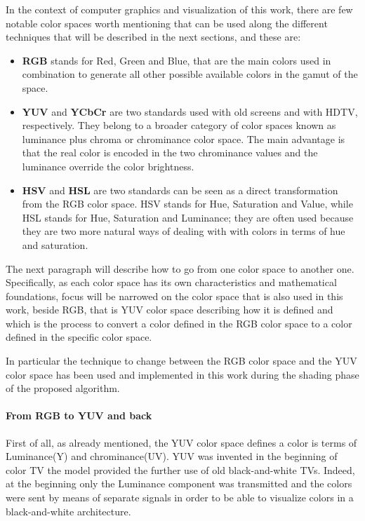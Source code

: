 \documentclass[12pt,a4paper]{extarticle}
\begin{document}
In the context of computer graphics and visualization of this work, there are few notable color spaces worth mentioning that can be used along the different techniques that will be described in the next sections, and these are:
\begin{itemize}
\item \textbf{RGB} stands for Red, Green and Blue, that are the main colors used in combination to generate all other possible available colors in the gamut of the space.
\item \textbf{YUV} and \textbf{YCbCr} are two standards used with old screens and with HDTV, respectively. They belong to a broader category of color spaces known as luminance plus chroma or chrominance color space. The main advantage is that the real color is encoded in the two chrominance values and the luminance override the color brightness.
\item \textbf{HSV} and \textbf{HSL} are two standards can be seen as a direct transformation from the RGB color space. HSV stands for Hue, Saturation and Value, while HSL stands for Hue, Saturation and Luminance; they are often used because they are two more natural ways of dealing with with colors in terms of hue and saturation.
\end{itemize}
The next paragraph will describe how to go from one color space to another one. Specifically, as each color space has its own characteristics and mathematical foundations, focus will be narrowed on the color space that is also used in this work, beside RGB, that is YUV color space describing how it is defined and which is the process to convert a color defined in the RGB color space to a color defined in the specific color space.


In particular the technique to change between the RGB color space and the YUV color space has been used and implemented in this work during the shading phase of the proposed algorithm.
\paragraph{From RGB to YUV and back} First of all, as already mentioned, the YUV color space defines a color is terms of Luminance(Y) and chrominance(UV). YUV was invented in the beginning of color TV the model provided the further use of old black-and-white TVs. Indeed, at the beginning only the Luminance component was transmitted and the colors were sent by means of separate signals in order to be able to visualize colors in a black-and-white architecture.
\end{document}
